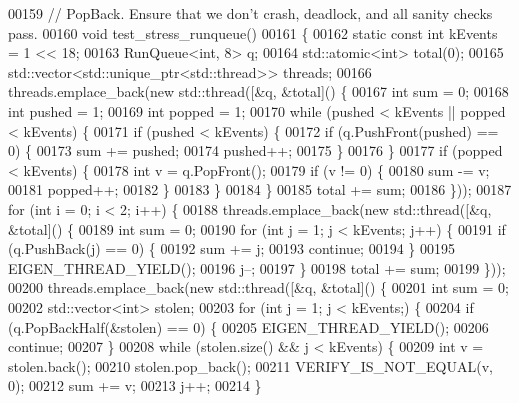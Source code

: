 \begin{DoxyCode}
00159 \textcolor{comment}{// PopBack. Ensure that we don't crash, deadlock, and all sanity checks pass.}
00160 \textcolor{keywordtype}{void} test\_stress\_runqueue()
00161 \{
00162   \textcolor{keyword}{static} \textcolor{keyword}{const} \textcolor{keywordtype}{int} kEvents = 1 << 18;
00163   RunQueue<int, 8> q;
00164   std::atomic<int> total(0);
00165   std::vector<std::unique\_ptr<std::thread>> threads;
00166   threads.emplace\_back(\textcolor{keyword}{new} std::thread([&q, &total]() \{
00167     \textcolor{keywordtype}{int} sum = 0;
00168     \textcolor{keywordtype}{int} pushed = 1;
00169     \textcolor{keywordtype}{int} popped = 1;
00170     \textcolor{keywordflow}{while} (pushed < kEvents || popped < kEvents) \{
00171       \textcolor{keywordflow}{if} (pushed < kEvents) \{
00172         \textcolor{keywordflow}{if} (q.PushFront(pushed) == 0) \{
00173           sum += pushed;
00174           pushed++;
00175         \}
00176       \}
00177       \textcolor{keywordflow}{if} (popped < kEvents) \{
00178         \textcolor{keywordtype}{int} v = q.PopFront();
00179         \textcolor{keywordflow}{if} (v != 0) \{
00180           sum -= v;
00181           popped++;
00182         \}
00183       \}
00184     \}
00185     total += sum;
00186   \}));
00187   \textcolor{keywordflow}{for} (\textcolor{keywordtype}{int} i = 0; i < 2; i++) \{
00188     threads.emplace\_back(\textcolor{keyword}{new} std::thread([&q, &total]() \{
00189       \textcolor{keywordtype}{int} sum = 0;
00190       \textcolor{keywordflow}{for} (\textcolor{keywordtype}{int} j = 1; j < kEvents; j++) \{
00191         \textcolor{keywordflow}{if} (q.PushBack(j) == 0) \{
00192           sum += j;
00193           \textcolor{keywordflow}{continue};
00194         \}
00195         EIGEN\_THREAD\_YIELD();
00196         j--;
00197       \}
00198       total += sum;
00199     \}));
00200     threads.emplace\_back(\textcolor{keyword}{new} std::thread([&q, &total]() \{
00201       \textcolor{keywordtype}{int} sum = 0;
00202       std::vector<int> stolen;
00203       \textcolor{keywordflow}{for} (\textcolor{keywordtype}{int} j = 1; j < kEvents;) \{
00204         \textcolor{keywordflow}{if} (q.PopBackHalf(&stolen) == 0) \{
00205           EIGEN\_THREAD\_YIELD();
00206           \textcolor{keywordflow}{continue};
00207         \}
00208         \textcolor{keywordflow}{while} (stolen.size() && j < kEvents) \{
00209           \textcolor{keywordtype}{int} v = stolen.back();
00210           stolen.pop\_back();
00211           VERIFY\_IS\_NOT\_EQUAL(v, 0);
00212           sum += v;
00213           j++;
00214         \}

\end{DoxyCode}
